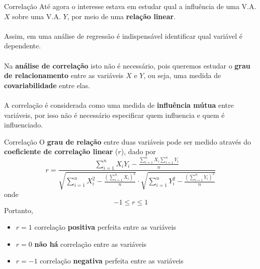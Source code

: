 \documentclass[10pt]{beamer}\usepackage[]{graphicx}\usepackage[]{color}
\theoremstyle{definition}
\begin{document}
\begin{frame}[fragile]{Correlação}
  Até agora o interesse estava em estudar qual a influência de uma
  V.A. $X$ sobre uma V.A. $Y$, por meio de uma \textbf{relação linear}. \\~\\
  Assim, em uma análise de regressão é indispensável identificar qual
  variável é dependente. \\~\\
  Na \textbf{análise de correlação} isto não é necessário, pois queremos
  estudar o \textbf{grau de relacionamento} entre as variáveis $X$ e
  $Y$, ou seja, uma medida de \textbf{covariabilidade} entre elas. \\~\\
  A correlação é considerada como uma medida de \textbf{influência
    mútua} entre variáveis, por isso não é necessário especificar quem
  influencia e quem é influenciado.
\end{frame}

\begin{frame}[fragile]{Correlação}
  O \textbf{grau de relação} entre duas variáveis pode ser medido
  através do \textbf{coeficiente de correlação linear} ($r$), dado por
  \begin{equation*}
    r = \frac{\sum_{i=1}^{n} X_iY_i - \frac{\sum_{i=1}^{n}
        X_i \sum_{i=1}^{n} Y_i}{n}}{\sqrt{\sum_{i=1}^{n}X_i^2 -
      \frac{(\sum_{i=1}^{n} X_i)^2}{n}} \cdot \sqrt{\sum_{i=1}^{n}Y_i^2 -
      \frac{(\sum_{i=1}^{n} Y_i)^2}{n}}}
  \end{equation*}
  onde
  \begin{equation*}
    -1 \leq r \leq 1
  \end{equation*}
  Portanto,
  \begin{itemize}
  \item $r=1$ correlação \textbf{positiva} perfeita entre as variáveis
  \item $r=0$ \textbf{não há} correlação entre as variáveis
  \item $r= -1$ correlação \textbf{negativa} perfeita entre as variáveis
  \end{itemize}
\end{frame}
\end{document}
